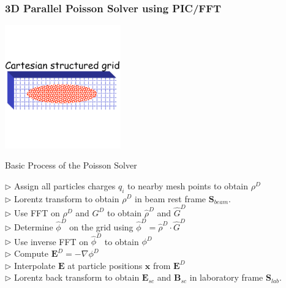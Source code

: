 \documentclass{beamer}
\newcommand{\bs}[1]{\mathbf #1}
\begin{document}
  \begin{frame}
    \frametitle{3D Parallel Poisson Solver using PIC/FFT}  
    \begin{center}
      \includegraphics[width=5.0cm]{figures/Grid}
    \end{center}
    \begin{block}{Basic Process of the Poisson Solver}
      \begin{tabbing}
	\quad $\triangleright$ Assign all particles charges $q_i$ to nearby mesh points to obtain $\rho^D$\\
	\pause
	\quad $\triangleright$ Lorentz transform to obtain $\rho^D$ in beam rest frame $\bs{S_{beam}}$.\\
	\pause
	\quad $\triangleright$ Use FFT on $\rho^D$ and $G^D$ to obtain $\widehat{\rho}^D$ and $\widehat{G}^D$ \\
	\pause
	\quad $\triangleright$ Determine $\widehat{\phi}^D$ on the grid using $\widehat{\phi}^D = \widehat{\rho}^D \cdot \widehat{G}^D$  \\
	\pause
	\quad $\triangleright$ Use inverse FFT on $\widehat{\phi }^D$ to obtain $\phi^D$ \\
	\pause
	\quad $\triangleright$ Compute $\bs{E}^D= -\nabla \phi^D$\\
	\pause
	\quad $\triangleright$ Interpolate $\bs{E}$ at particle positions $\bs{x}$ from $\bs{E}^D$  \\
	\pause
	\quad $\triangleright$ Lorentz back transform to obtain $\bs{E_{sc}}$ and $\bs{B_{sc}}$ in laboratory frame $\bs{S_{lab}}$.\\ 
      \end{tabbing}
    \end{block}
    
  \end{frame}


\end{document}
